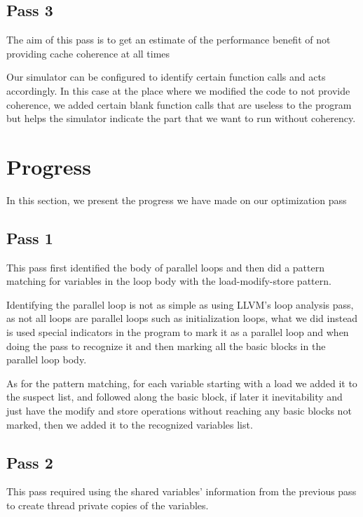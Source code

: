 \documentclass[12pt,conference]{IEEEtran}
\begin{document}
\subsection{Pass 3}

The aim of this pass is to get an estimate of the performance
benefit of not providing cache coherence at all times

Our simulator can be configured to identify certain function calls and acts accordingly. In this case at the place where we modified the code to not provide coherence, we added certain blank function calls that are useless to the program but helps the simulator indicate the part that we want to run without coherency.

\section{Progress}

In this section, we present the progress we have made on our 
optimization pass

\subsection{Pass 1}

This pass first identified the body of parallel loops and then did a pattern matching for variables in the loop body with the load-modify-store pattern.

Identifying the parallel loop is not as simple as using LLVM's loop analysis pass, as not all loops are parallel loops such as initialization loops, what we did instead is used special indicators in the program to mark it as a parallel loop and when doing the pass to recognize it and then marking all the basic blocks in the parallel loop body. 

As for the pattern matching, for each variable starting with a load we added it to the suspect list, and followed along the basic block, if later it inevitability and just have the modify and store operations without reaching any basic blocks not marked, then we added it to the recognized variables list.

\subsection{Pass 2}

This pass required using the shared variables' information from the previous pass 
to create thread private copies of the variables.
\end{document}
